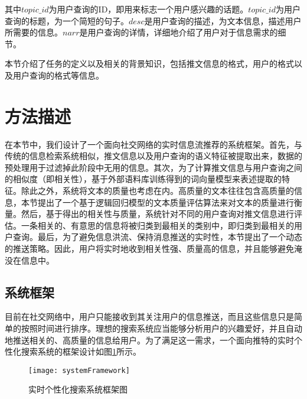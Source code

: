 其中$topic\_id$为用户查询的ID，即用来标志一个用户感兴趣的话题。$topic\_id$为用户查询的标题，为一个简短的句子。$desc$是用户查询的描述，为文本信息，描述用户所需要的信息。$narr$是用户查询的详情，详细地介绍了用户对于信息需求的细节。

本节介绍了任务的定义以及相关的背景知识，包括推文信息的格式，用户的格式以及用户查询的格式等信息。

\section{方法描述}
\label{sec2:method}
在本节中，我们设计了一个面向社交网络的实时信息流推荐的系统框架。首先，与传统的信息检索系统相似，推文信息以及用户查询的语义特征被提取出来，数据的预处理用于过滤掉此阶段中无用的信息。其次，为了计算推文信息与用户查询之间的相似度（即相关性），基于外部语料库训练得到的词向量模型来表述提取的特征。除此之外，系统将文本的质量也考虑在内。高质量的文本往往包含高质量的信息，本节提出了一个基于逻辑回归模型的文本质量评估算法来对文本的质量进行衡量。然后，基于得出的相关性与质量，系统针对不同的用户查询对推文信息进行评估。一条相关的、有意思的信息将被归类到最相关的类别中，即归类到最相关的用户查询。最后，为了避免信息洪流、保持消息推送的实时性，本节提出了一个动态的推送策略。因此，用户将实时地收到相关性强、质量高的信息，并且能够避免淹没在信息中。

\subsection{系统框架}
\label{subsec2:systemOverview}
目前在社交网络中，用户只能接收到其关注用户的信息推送，而且这些信息只是简单的按照时间进行排序。理想的搜索系统应当能够分析用户的兴趣爱好，并且自动地推送相关的、高质量的信息给用户。为了满足这一需求，一个面向推特的实时个性化搜索系统的框架设计如图\ref{fig:systemFramework}所示。
\begin{figure}[!htbp] %
  \centering
  \texttt{[image: systemFramework]}
  \caption{实时个性化搜索系统框架图}
  \label{fig:systemFramework}
\end{figure}

